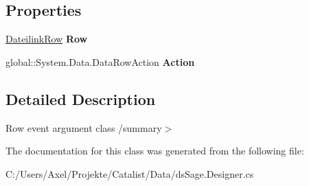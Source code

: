 \subsection*{Properties}
\begin{DoxyCompactItemize}
\item 
\hyperlink{class_products_1_1_data_1_1ds_sage_1_1_dateilink_row}{Dateilink\+Row} {\bfseries Row}\hypertarget{class_products_1_1_data_1_1ds_sage_1_1_dateilink_row_change_event_a9a8a35a47f5230c120077ca99aa6cf88}{}\label{class_products_1_1_data_1_1ds_sage_1_1_dateilink_row_change_event_a9a8a35a47f5230c120077ca99aa6cf88}

\item 
global\+::\+System.\+Data.\+Data\+Row\+Action {\bfseries Action}\hypertarget{class_products_1_1_data_1_1ds_sage_1_1_dateilink_row_change_event_a7178bbc154dba61879284cfc3bbe1d9f}{}\label{class_products_1_1_data_1_1ds_sage_1_1_dateilink_row_change_event_a7178bbc154dba61879284cfc3bbe1d9f}

\end{DoxyCompactItemize}


\subsection{Detailed Description}
Row event argument class /summary$>$ 

The documentation for this class was generated from the following file\+:\begin{DoxyCompactItemize}
\item 
C\+:/\+Users/\+Axel/\+Projekte/\+Catalist/\+Data/ds\+Sage.\+Designer.\+cs\end{DoxyCompactItemize}
